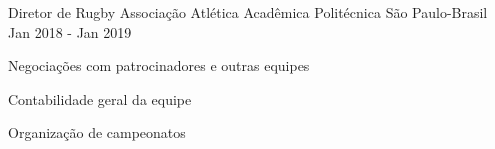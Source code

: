


\begin{cventries}


\cventry
{Diretor de Rugby} %
{Associação Atlética Acadêmica Politécnica} %
{São Paulo-Brasil} %
{Jan 2018 - Jan 2019} %
{}
\vspace{-4mm}
{ %
\begin{cvitems}
  \item {Negociações com patrocinadores e outras equipes}
  \item {Contabilidade geral da equipe}
  \item {Organização de campeonatos}
\end{cvitems}
\vspace{5mm}
}



\end{cventries}
